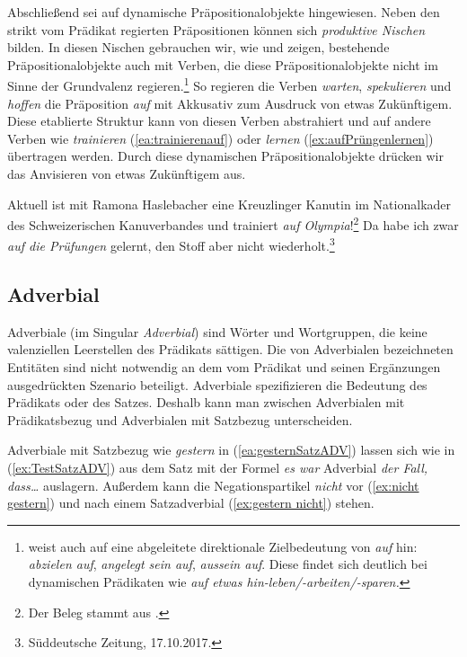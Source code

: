 Abschließend sei auf dynamische Präpositionalobjekte hingewiesen. Neben den strikt vom Prädikat regierten Präpositionen können sich \textit{produktive Nischen} bilden. In diesen Nischen gebrauchen wir, wie \citet[104]{Rostila2014} und \citet[162, 178--180]{Hoellein2019} zeigen, bestehende Präpositionalobjekte auch mit Verben, die diese Präpositionalobjekte nicht im Sinne der Grundvalenz regieren.\footnote{\citet[104--105]{Rostila2014} weist auch auf eine abgeleitete direktionale Zielbedeutung von \textit{auf} hin: \textit{abzielen auf}, \textit{angelegt sein auf}, \textit{aussein auf}. Diese findet sich deutlich bei dynamischen Prädikaten wie \textit{auf etwas hin-leben/-arbeiten/-sparen.}} So regieren die Verben \textit{warten}, \textit{spekulieren} und \textit{hoffen} die Präposition \textit{auf} mit Akkusativ zum Ausdruck von etwas Zukünftigem. Diese etablierte Struktur kann von diesen Verben abstrahiert und auf andere Verben wie \textit{trainieren} (\ref{ea:trainierenauf}) oder \textit{lernen} (\ref{ex:aufPrüngenlernen}) übertragen werden. Durch diese dynamischen Präpositionalobjekte drücken wir das Anvisieren von etwas Zukünftigem aus. 

\ea \label{ea:Prospektum}
\ea \label{ea:trainierenauf} Aktuell ist mit Ramona Haslebacher eine Kreuzlinger Kanutin im Nationalkader des Schweizerischen Kanuverbandes und trainiert \textit{auf Olympia}!\footnote{Der Beleg stammt aus \citet[180]{Hoellein2019}.}
\ex \label{ex:aufPrüngenlernen} Da habe ich zwar \textit{auf die Prüfungen} gelernt, den Stoff aber nicht wiederholt.\footnote{Süddeutsche Zeitung, 17.10.2017.}
\z 
\z 


\subsection{Adverbial}\label{subsection:Adverbial}

Adverbiale (im Singular \textit{Adverbial}) sind Wörter und Wortgruppen, die keine valenziellen Leerstellen des Prädikats sättigen. Die von Adverbialen bezeichneten Entitäten sind nicht notwendig an dem vom Prädikat und seinen Ergänzungen ausgedrückten Szenario beteiligt. Adverbiale spezifizieren die Bedeutung des Prädikats oder des Satzes. Deshalb kann man zwischen Adverbialen mit Prädikatsbezug und Adverbialen mit Satzbezug unterscheiden. 

Adverbiale mit Satzbezug wie \textit{gestern} in (\ref{ea:gesternSatzADV}) lassen sich wie in (\ref{ex:TestSatzADV}) aus dem Satz mit der Formel \textit{es war} Adverbial \textit{der Fall, dass\ldots{}} auslagern. Außerdem kann die Negationspartikel \textit{nicht} vor (\ref{ex:nicht gestern}) und nach einem Satzadverbial (\ref{ex:gestern nicht}) stehen.


